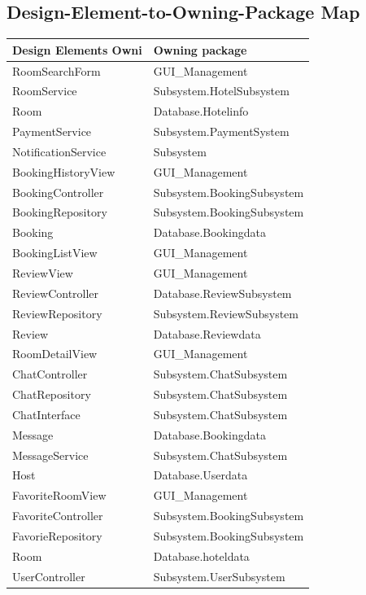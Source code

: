 \subsection{Design-Element-to-Owning-Package Map}
\begin{longtable}{|p{6cm}|p{9cm}|}
\hline
\textbf{Design Elements
Owni} & \textbf{Owning package} \\
\hline
RoomSearchForm & GUI\_Management \\
\hline
RoomService & Subsystem.HotelSubsystem \\
\hline
Room & Database.Hotelinfo \\
\hline
PaymentService & Subsystem.PaymentSystem \\
\hline
NotificationService & Subsystem \\
\hline
BookingHistoryView & GUI\_Management \\
\hline
BookingController & Subsystem.BookingSubsystem \\
\hline
BookingRepository & Subsystem.BookingSubsystem \\
\hline
Booking & Database.Bookingdata\\
\hline
BookingListView & GUI\_Management \\
\hline
ReviewView & GUI\_Management \\
\hline
ReviewController & Database.ReviewSubsystem \\
\hline
ReviewRepository & Subsystem.ReviewSubsystem \\
\hline
Review & Database.Reviewdata \\
\hline
RoomDetailView & GUI\_Management \\
\hline
ChatController & Subsystem.ChatSubsystem \\
\hline
ChatRepository & Subsystem.ChatSubsystem \\
\hline
ChatInterface &  Subsystem.ChatSubsystem\\
\hline
Message & Database.Bookingdata\\
\hline
MessageService & Subsystem.ChatSubsystem \\
\hline
Host & Database.Userdata \\
\hline
FavoriteRoomView & GUI\_Management \\
\hline
FavoriteController & Subsystem.BookingSubsystem \\ 
\hline
FavorieRepository & Subsystem.BookingSubsystem \\
\hline
Room & Database.hoteldata \\
\hline
UserController & Subsystem.UserSubsystem \\

\end{longtable}
